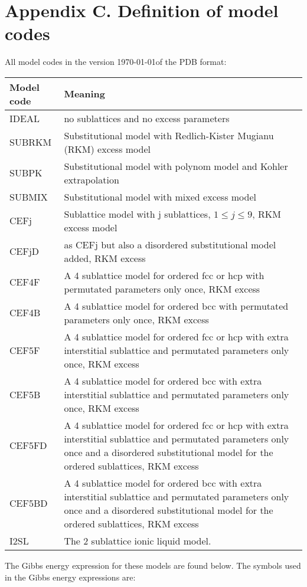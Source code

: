 \documentclass[12pt]{article}
\begin{document}
\newpage

\section{Appendix C.  Definition of model codes}

All model codes in the version \today of the PDB format:

\begin{tabular}{l p{130mm}}
Model code & Meaning\\\hline
IDEAL & no sublattices and no excess parameters\\
SUBRKM & Substitutional model with Redlich-Kister Mugianu (RKM) excess model\\
SUBPK  & Substitutional model with polynom model and Kohler extrapolation\\
SUBMIX & Substitutional model with mixed excess model\\
CEFj   & Sublattice model with j sublattices, $1\leq j\leq 9$, RKM excess model\\
CEFjD & as CEFj but also a disordered substitutional model added, RKM excess\\
CEF4F & A 4 sublattice model for ordered fcc or hcp with permutated parameters only once, RKM excess\\
CEF4B & A 4 sublattice model for ordered bcc with permutated parameters only once, RKM excess\\
CEF5F & A 4 sublattice model for ordered fcc or hcp with extra interstitial sublattice
and permutated parameters only once, RKM excess\\
CEF5B & A 4 sublattice model for ordered bcc with extra interstitial sublattice
and permutated parameters only once, RKM excess\\
CEF5FD & A 4 sublattice model for ordered fcc or hcp with extra interstitial sublattice
and permutated parameters only once and a disordered substitutional model for
the ordered sublattices, RKM excess\\
CEF5BD & A 4 sublattice model for ordered bcc with extra interstitial sublattice
and permutated parameters only once and a disordered substitutional model for
the ordered sublattices, RKM excess\\
I2SL & The 2 sublattice ionic liquid model.\\
\end{tabular}

The Gibbs energy expression for these models are found below.  The
symbols used in the Gibbs energy expressions are:
\end{document}
